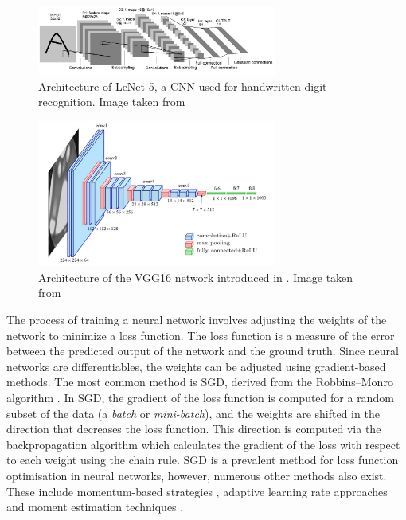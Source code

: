 \begin{figure}[htbp]
    \centering
    \includegraphics[width=0.70\textwidth]{chapter_sota/assets/lenet.png}
    \caption{Architecture of LeNet-5, a \acl{CNN} used for handwritten digit
    recognition. Image taken from \cite{DBLP:journals/pieee/LeCunBBH98}}
    \label{fig:sota:lenet5}
\end{figure}

\begin{figure}[htbp]
    \centering
    \includegraphics[width=0.7\textwidth]{chapter_sota/assets/vgg16.png}
    \caption{Architecture of the VGG16 network introduced in
    \cite{DBLP:journals/corr/SimonyanZ14a}. Image taken from
    \cite{ferguson2017automatic}}
    \label{fig:sota:vgg16}
\end{figure}


The process of training a neural network involves adjusting the weights of the
network to minimize a loss function. The loss function is a measure of the error
between the predicted output of the network and the ground truth. Since neural
networks are differentiables, the weights can be adjusted using gradient-based
methods. The most common method is \acf{SGD}, derived from the Robbins–Monro
algorithm \cite{robbins1951stochastic}. In \ac{SGD}, the gradient of the loss
function is computed for a random subset of the data (a \emph{batch} or
\emph{mini-batch}), and the weights are shifted in the direction that decreases
the loss function. This direction is computed via the backpropagation algorithm
\cite{rumelhart1986learning} which calculates the gradient of the loss with
respect to each weight using the chain rule. \acl{SGD} is a prevalent method for
loss function optimisation in neural networks, however, numerous other methods
also exist. These include momentum-based strategies
\cite{sutskever2013importance}, adaptive learning rate approaches
\cite{zeiler2012adadelta} and moment estimation techniques
\cite{kingma2014adam}.\\


